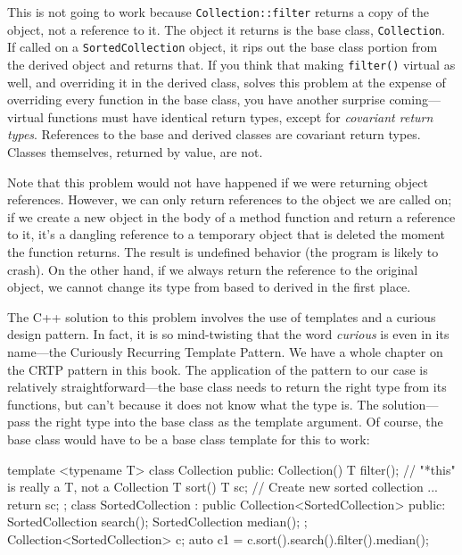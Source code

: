 This is not going to work because \texttt{Collection::filter} returns a copy of the object, not a reference to it. The object it returns is the base class, \texttt{Collection}. If called on a \texttt{SortedCollection} object, it rips out the base class portion from the derived object and returns that. If you think that making \texttt{filter()} virtual as well, and overriding it in the derived class, solves this problem at the expense of overriding every function in the base class, you have another surprise coming---virtual functions must have identical return types, except for \emph{covariant return types}. References to the base and derived classes are covariant return types. Classes themselves, returned by value, are not.

Note that this problem would not have happened if we were returning object references. However, we can only return references to the object we are called on; if we create a new object in the body of a method function and return a reference to it, it's a dangling reference to a temporary object that is deleted the moment the function returns. The result is undefined behavior (the program is likely to crash). On the other hand, if we always return the reference to the original object, we cannot change its type from based to derived in the first place.

The C++ solution to this problem involves the use of templates and a curious design pattern. In fact, it is so mind-twisting that the word \emph{curious} is even in its name---the Curiously Recurring Template Pattern. We have a whole chapter on the CRTP pattern in this book. The application of the pattern to our case is relatively straightforward---the base class needs to return the right type from its functions, but can't because it does not know what the type is. The solution---pass the right type into the base class as the template argument. Of course, the base class would have to be a base class template for this to work:

\begin{code}
template <typename T> class Collection {
  public:
  Collection() {}
  T filter(); // "*this" is really a T, not a Collection
  T sort() {
    T sc; // Create new sorted collection
    ...
    return sc;
  }
};
class SortedCollection :
  public Collection<SortedCollection> {
  public:
  SortedCollection search();
  SortedCollection median();
};
Collection<SortedCollection> c;
auto c1 = c.sort().search().filter().median();
\end{code}

